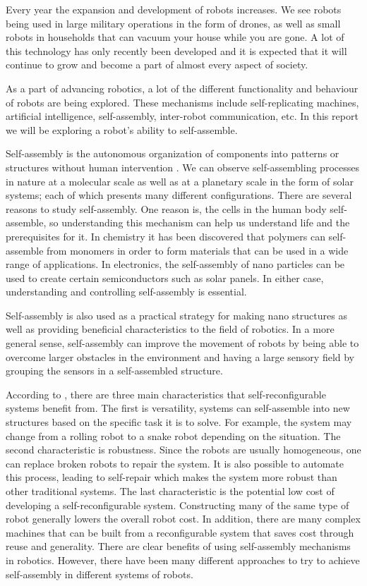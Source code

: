 Every year the expansion and development of robots increases. 
We see robots being used in large military operations in the form of drones, as well as small robots in households that can vacuum your house while you are gone.
A lot of this technology has only recently been developed and it is expected that it will continue to grow and become a part of almost every aspect of society.

As a part of advancing robotics, a lot of the different functionality and behaviour of robots are being explored.
These mechanisms include self-replicating machines, artificial intelligence, self-assembly, inter-robot communication, etc.
In this report we will be exploring a robot's ability to self-assemble. 

Self-assembly is the autonomous organization of components into patterns or structures without human intervention \cite{whitesides_self-assembly_2002}.
We can observe self-assembling processes in nature at a molecular scale \cite{heylighen_science_2001} as well as at a planetary scale in the form of solar systems; each of which presents many different configurations.
There are several reasons to study self-assembly.
One reason is, the cells in the human body self-assemble, so understanding this mechanism can help us understand life and the prerequisites for it.
In chemistry it has been discovered that polymers can self-assemble from monomers in order to form materials that can be used in a wide range of applications\cite{chung_use_2004}\cite{siracusa_biodegradable_2008}. 
In electronics, the self-assembly of nano particles can be used to create certain semiconductors such as solar panels\cite{henini_chapter_2008}.
In either case, understanding and controlling self-assembly is essential.

Self-assembly is also used as a practical strategy for making nano structures as well as providing beneficial characteristics to the field of robotics.
In a more general sense, self-assembly can improve the movement of robots by being able to overcome larger obstacles in the environment and having a large sensory field by grouping the sensors in a self-assembled structure.

According to \cite{yim_modular_2007}, there are three main characteristics that self-reconfigurable systems benefit from.
The first is versatility, systems can self-assemble into new structures based on the specific task it is to solve.
For example, the system may change from a rolling robot to a snake robot depending on the situation.
The second characteristic is robustness.
Since the robots are usually homogeneous, one can replace broken robots to repair the system.
It is also possible to automate this process, leading to self-repair which makes the system more robust than other traditional systems.
The last characteristic is the potential low cost of developing a self-reconfigurable system.
Constructing many of the same type of robot generally lowers the overall robot cost.
In addition, there are many complex machines that can be built from  a reconfigurable system that saves cost through reuse and generality.
There are clear benefits of using self-assembly mechanisms in robotics.
However, there have been many different approaches to try to achieve self-assembly in different systems of robots.


